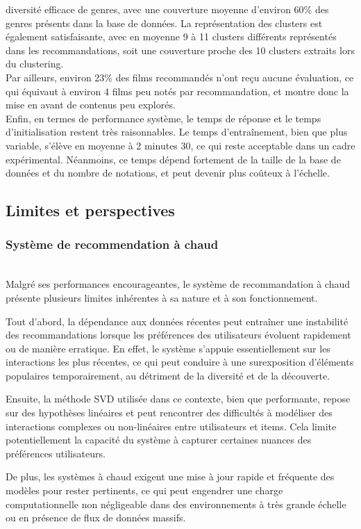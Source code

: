 \documentclass{article}
\begin{document}
diversité efficace de genres, avec une couverture moyenne d’environ 60\% des genres présents dans la base de données.
La représentation des clusters est également satisfaisante, avec en moyenne 9 à 11 clusters différents représentés dans
les recommandations, soit une couverture proche des 10 clusters extraits lors du clustering.\\
Par ailleurs, environ 23\% des films recommandés n’ont reçu aucune évaluation, ce qui équivaut à environ 4 films peu notés
par recommandation, et montre donc la mise en avant de contenus peu explorés.\\
Enfin, en termes de performance système, le temps de réponse et le temps d’initialisation restent très raisonnables. Le temps d’entraînement, bien que plus variable, s’élève en moyenne à 2 minutes 30, ce qui reste acceptable dans un cadre expérimental. Néanmoins, ce temps dépend fortement de la taille de la base de données et du nombre de notations, et peut devenir plus coûteux à l’échelle.

\subsection{Limites et perspectives}
\subsubsection{Système de recommendation à chaud}
$ $\\
Malgré ses performances encourageantes, le système de recommandation à chaud présente plusieurs limites inhérentes à sa nature et à son fonctionnement.

Tout d’abord, la dépendance aux données récentes peut entraîner une instabilité des recommandations lorsque les préférences des utilisateurs évoluent rapidement ou de manière erratique. En effet, le système s’appuie essentiellement sur les interactions les plus récentes, ce qui peut conduire à une surexposition d’éléments populaires temporairement, au détriment de la diversité et de la découverte.

Ensuite, la méthode SVD utilisée dans ce contexte, bien que performante, repose sur des hypothèses linéaires et peut rencontrer des difficultés à modéliser des interactions complexes ou non-linéaires entre utilisateurs et items. Cela limite potentiellement la capacité du système à capturer certaines nuances des préférences utilisateurs.

De plus, les systèmes à chaud exigent une mise à jour rapide et fréquente des modèles pour rester pertinents, ce qui peut engendrer une charge computationnelle non négligeable dans des environnements à très grande échelle ou en présence de flux de données massifs.
\end{document}
